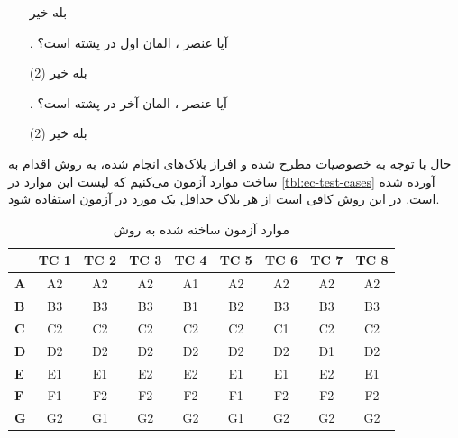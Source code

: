 \documentclass[twoside]{article}
\newenvironment{answer}{}{\medskip}
\begin{document}
\begin{answer}
\begin{enumerate}[label=.\Alph*]
\begin{tasks}
		\task[\lr{1}. ]
بله
		\task[\lr{2}. ]
خیر
	\end{tasks}
	\item[\lr{\textbf{F}}.]
آیا عنصر ، المان اول در پشته است؟
	\begin{tasks}(2)
		\task[\lr{1}. ]
بله
		\task[\lr{2}. ]
خیر
	\end{tasks}
	\item[\lr{\textbf{G}}.]
آیا عنصر ، المان آخر در پشته است؟
	\begin{tasks}(2)
		\task[\lr{1}. ]
بله
		\task[\lr{2}. ]
خیر
	\end{tasks}
\end{enumerate}
حال با توجه به خصوصیات مطرح شده و افراز بلاک‌های انجام شده، به روش %
اقدام به ساخت موارد آزمون می‌کنیم که لیست این موارد در \autoref{tbl:ec-test-cases} آورده شده است. در این روش کافی است از هر بلاک حداقل یک مورد در آزمون استفاده شود.

	\begin{table}[h]
		\centering
		\caption{موارد آزمون ساخته شده به روش }
		\label{tbl:ec-test-cases}
		\begin{latin}
		\begin{tabular}{l|c|c|c|c|c|c|c|c|}
			\cline{2-9}
			& \textbf{TC 1} & \textbf{TC 2} & \textbf{TC 3} & \textbf{TC 4} & \textbf{TC 5} & \textbf{TC 6} & \textbf{TC 7} & \textbf{TC 8} \\ \hline
			\multicolumn{1}{|l|}{\textbf{A}} & A2         & A2         & A2         & A1         & A2         & A2         & A2         & A2         \\ \hline
			\multicolumn{1}{|l|}{\textbf{B}} & B3         & B3         & B3         & B1         & B2         & B3         & B3         & B3         \\ \hline
			\multicolumn{1}{|l|}{\textbf{C}} & C2         & C2         & C2         & C2         & C2         & C1         & C2         & C2         \\ \hline
			\multicolumn{1}{|l|}{\textbf{D}} & D2         & D2         & D2         & D2         & D2         & D2         & D1         & D2         \\ \hline
			\multicolumn{1}{|l|}{\textbf{E}} & E1         & E1         & E2         & E2         & E1         & E1         & E2         & E1         \\ \hline
			\multicolumn{1}{|l|}{\textbf{F}} & F1         & F2         & F2         & F2         & F1         & F2         & F2         & F2         \\ \hline
			\multicolumn{1}{|l|}{\textbf{G}} & G2         & G1         & G2         & G2         & G1         & G2         & G2         & G2         \\ \hline
		\end{tabular}
	\end{latin}
	\end{table}


\end{answer}
\end{document}

